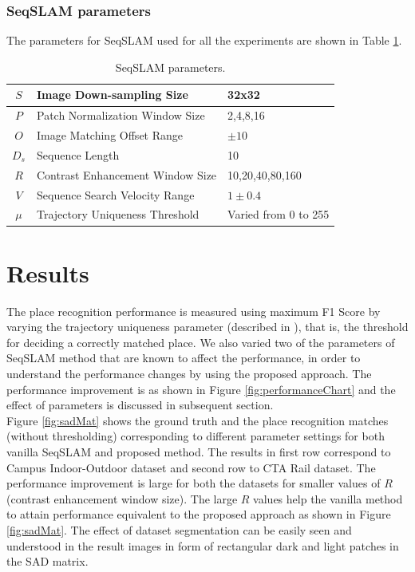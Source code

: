 \documentclass[twocolumn]{article}
\begin{document}
\subsubsection{SeqSLAM parameters}
The parameters for SeqSLAM used for all the experiments are shown in Table \ref{table:seqSLAMParams}.

\begin{table}[!htbp]
 \begin{tabular}{|c|p{4cm}|p{2.5cm}|}
 \hline
  $S$ & Image Down-sampling Size & 32x32 \\
  \hline
  $P$ & Patch Normalization Window Size & {2,4,8,16} \\
  \hline
  $O$ & Image Matching Offset Range & $\pm10$ \\
  \hline
  $D_s$ & Sequence Length & 10 \\
  \hline
  $R$ & Contrast Enhancement Window Size & {10,20,40,80,160} \\
  \hline
  $V$ & Sequence Search Velocity Range & $1\pm0.4$ \\
  \hline
  $\mu$ & Trajectory Uniqueness Threshold & Varied from 0 to 255 \\
 \hline
 \end{tabular}
\caption{SeqSLAM parameters.}
\label{table:seqSLAMParams}
\end{table}


\section{Results}
The place recognition performance is measured using maximum F1 Score by varying the trajectory uniqueness parameter (described in \cite{Milford2012}), that is, the threshold for deciding a correctly matched place. We also varied two of the parameters of SeqSLAM method that are known to affect the performance, in order to understand the performance changes by using the proposed approach. The performance improvement is as shown in Figure \ref{fig:performanceChart} and the effect of parameters is discussed in subsequent section. 
\\
Figure \ref{fig:sadMat} shows the ground truth and the place recognition matches (without thresholding) corresponding to different parameter settings for both vanilla SeqSLAM and proposed method. The results in first row correspond to Campus Indoor-Outdoor dataset and second row to CTA Rail dataset. The performance improvement is large for both the datasets for smaller values of $R$ (contrast enhancement window size). The large $R$ values help the vanilla method to attain performance equivalent to the proposed approach as shown in Figure \ref{fig:sadMat}. The effect of dataset segmentation can be easily seen and understood in the result images in form of rectangular dark and light patches in the SAD matrix. 
\end{document}
